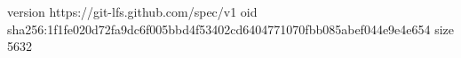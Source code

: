 version https://git-lfs.github.com/spec/v1
oid sha256:1f1fe020d72fa9dc6f005bbd4f53402cd6404771070fbb085abef044e9e4e654
size 5632
